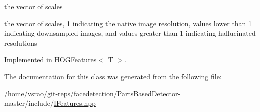 the vector of scales 

the vector of scales, 1 indicating the native image resolution, values lower than 1 indicating downsampled images, and values greater than 1 indicating hallucinated resolutions 

Implemented in \hyperlink{classHOGFeatures_ad9668fda860881c676e1d1bd70adc18c}{H\-O\-G\-Features$<$ T $>$}.



The documentation for this class was generated from the following file\-:\begin{DoxyCompactItemize}
\item 
/home/vsrao/git-\/reps/facedetection/\-Parts\-Based\-Detector-\/master/include/\hyperlink{IFeatures_8hpp}{I\-Features.\-hpp}\end{DoxyCompactItemize}
